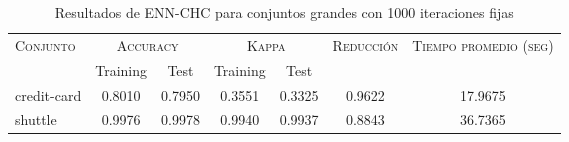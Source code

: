 \begin{table}[]
\centering
\begin{tabular}{l c c c c c c}
\hline
\multirow{2}{*}{\textsc{Conjunto}}
	& \multicolumn{2}{c}{\textsc{Accuracy}}
	& \multicolumn{2}{c}{\textsc{Kappa}}
	& \textsc{Reducción}
	& \textsc{Tiempo promedio (seg)} \\
	& Training & Test
	& Training & Test \\ 
\hline
\hline

credit-card & 0.8010 & 0.7950 & 0.3551 & 0.3325 & 0.9622 & 17.9675 \\
shuttle & 0.9976 & 0.9978 & 0.9940 & 0.9937 & 0.8843 & 36.7365 \\

\hline
\end{tabular}
\caption{Resultados de ENN-CHC para conjuntos grandes con 1000 iteraciones fijas}
\label{res-grande-ENN-CHC}
\end{table}

